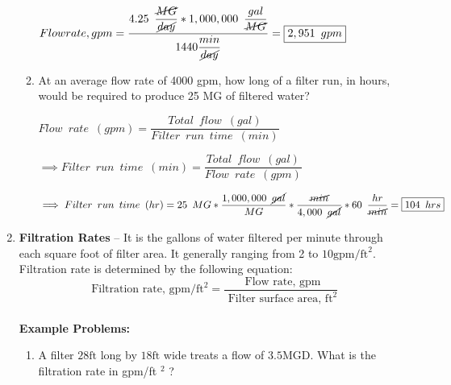 \begin{enumerate}
\begin{enumerate}[1.]
$Flow rate, gpm=\dfrac{4.25 \enspace \dfrac{\cancel{MG}}{\cancel{day}} *1,000,000 \enspace \dfrac{gal}{\cancel{MG}}}{1440\dfrac{min}{\cancel{day}}}=\boxed{2,951 \enspace gpm}$

 

\vspace{0.3cm}

\item At an average flow rate of 4000 gpm, how long of a filter run, in hours, would be required to produce 25 MG of filtered water?\\

\vspace{0.2cm}

$Flow \enspace rate \enspace (gpm)=\dfrac{Total \enspace flow \enspace (gal)}{Filter \enspace run \enspace time \enspace (min)}$

\vspace{0.3cm}

$\implies Filter \enspace run \enspace time \enspace (min)=\dfrac{Total \enspace flow \enspace (gal)}{Flow \enspace rate \enspace (gpm)}$\\

\vspace{0.3cm}

$\implies Filter \enspace run \enspace time \enspace (hr)=25 \enspace MG*\dfrac{1,000,000 \enspace \cancel{gal}}{MG}*\dfrac{\cancel{min}}{4,000 \enspace \cancel{gal}}*60 \enspace \dfrac{hr}{\cancel{min}}=\boxed{104 \enspace hrs}$

\end{enumerate}

 

\item \textbf{Filtration Rates} – It is the gallons of water filtered per minute through each square foot of filter area.  It generally ranging from 2 to $10 \mathrm{gpm} / \mathrm{ft}^{2}$.\\

Filtration rate is determined by the following equation:\\
$$
\text { Filtration rate, } \mathrm{gpm} / \mathrm{ft}^{2}=\frac{\text { Flow rate, } \mathrm{gpm}}{\text { Filter surface area, } \mathrm{ft}^{2}}
$$\\


\textbf{Example Problems:}\\
\begin{enumerate}[1.]
\item A filter $28 \mathrm{ft}$ long by $18 \mathrm{ft}$ wide treats a flow of $3.5 \mathrm{MGD}$. What is the filtration rate in gpm/ft ${ }^{2}$ ?\\


\end{enumerate}
\end{enumerate}
